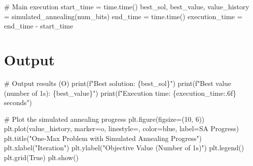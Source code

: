 \documentclass[
  letterpaper,
  DIV=11,
  numbers=noendperiod]{scrreprt}
\newenvironment{Shaded}{\begin{snugshade}}{\end{snugshade}}
\newcommand{\BuiltInTok}[1]{\textcolor[rgb]{0.00,0.23,0.31}{#1}}
\newcommand{\CommentTok}[1]{\textcolor[rgb]{0.37,0.37,0.37}{#1}}
\newcommand{\DecValTok}[1]{\textcolor[rgb]{0.68,0.00,0.00}{#1}}
\newcommand{\NormalTok}[1]{\textcolor[rgb]{0.00,0.23,0.31}{#1}}
\newcommand{\OperatorTok}[1]{\textcolor[rgb]{0.37,0.37,0.37}{#1}}
\newcommand{\SpecialCharTok}[1]{\textcolor[rgb]{0.37,0.37,0.37}{#1}}
\newcommand{\SpecialStringTok}[1]{\textcolor[rgb]{0.13,0.47,0.30}{#1}}
\newcommand{\StringTok}[1]{\textcolor[rgb]{0.13,0.47,0.30}{#1}}
\newcommand{\VariableTok}[1]{\textcolor[rgb]{0.07,0.07,0.07}{#1}}
\begin{document}
\begin{Shaded}
\begin{Highlighting}[]
\CommentTok{\# Main execution}
\NormalTok{start\_time }\OperatorTok{=}\NormalTok{ time.time()}
\NormalTok{best\_sol, best\_value, value\_history }\OperatorTok{=}\NormalTok{ simulated\_annealing(num\_bits)}
\NormalTok{end\_time }\OperatorTok{=}\NormalTok{ time.time()}
\NormalTok{execution\_time }\OperatorTok{=}\NormalTok{ end\_time }\OperatorTok{{-}}\NormalTok{ start\_time}
\end{Highlighting}
\end{Shaded}

\section{Output}\label{output-3}

\begin{Shaded}
\begin{Highlighting}[]
\CommentTok{\# Output results (O)}
\BuiltInTok{print}\NormalTok{(}\SpecialStringTok{f"Best solution: }\SpecialCharTok{\{}\NormalTok{best\_sol}\SpecialCharTok{\}}\SpecialStringTok{"}\NormalTok{)}
\BuiltInTok{print}\NormalTok{(}\SpecialStringTok{f"Best value (number of 1s): }\SpecialCharTok{\{}\NormalTok{best\_value}\SpecialCharTok{\}}\SpecialStringTok{"}\NormalTok{)}
\BuiltInTok{print}\NormalTok{(}\SpecialStringTok{f"Execution time: }\SpecialCharTok{\{}\NormalTok{execution\_time}\SpecialCharTok{:.6f\}}\SpecialStringTok{ seconds"}\NormalTok{)}

\CommentTok{\# Plot the simulated annealing progress}
\NormalTok{plt.figure(figsize}\OperatorTok{=}\NormalTok{(}\DecValTok{10}\NormalTok{, }\DecValTok{6}\NormalTok{))}
\NormalTok{plt.plot(value\_history, marker}\OperatorTok{=}\StringTok{\textquotesingle{}o\textquotesingle{}}\NormalTok{, linestyle}\OperatorTok{=}\StringTok{\textquotesingle{}{-}{-}\textquotesingle{}}\NormalTok{, color}\OperatorTok{=}\StringTok{\textquotesingle{}blue\textquotesingle{}}\NormalTok{, label}\OperatorTok{=}\StringTok{\textquotesingle{}SA Progress\textquotesingle{}}\NormalTok{)}
\NormalTok{plt.title(}\StringTok{"One{-}Max Problem with Simulated Annealing Progress"}\NormalTok{)}
\NormalTok{plt.xlabel(}\StringTok{"Iteration"}\NormalTok{)}
\NormalTok{plt.ylabel(}\StringTok{"Objective Value (Number of 1s)"}\NormalTok{)}
\NormalTok{plt.legend()}
\NormalTok{plt.grid(}\VariableTok{True}\NormalTok{)}
\NormalTok{plt.show()}
\end{Highlighting}
\end{Shaded}
\end{document}
